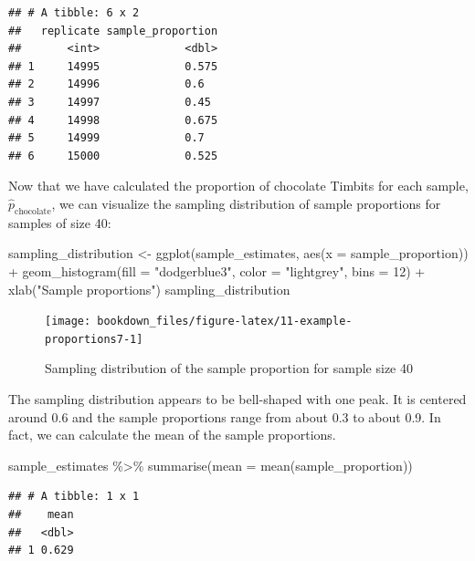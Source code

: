 \documentclass[
]{krantz}
\makeatletter
\newenvironment{Shaded}{\begin{snugshade}}{\end{snugshade}}
\newcommand{\AttributeTok}[1]{\textcolor[rgb]{0.61,0.61,0.61}{#1}}
\newcommand{\DecValTok}[1]{\textcolor[rgb]{0.06,0.06,0.06}{#1}}
\newcommand{\FunctionTok}[1]{\textcolor[rgb]{0,0,0}{#1}}
\newcommand{\NormalTok}[1]{#1}
\newcommand{\OtherTok}[1]{\textcolor[rgb]{0.37,0.37,0.37}{#1}}
\newcommand{\SpecialCharTok}[1]{\textcolor[rgb]{0,0,0}{#1}}
\newcommand{\StringTok}[1]{\textcolor[rgb]{0.5,0.5,0.5}{#1}}
\newenvironment{kframe}{%
\medskip{}
\setlength{\fboxsep}{.8em}
 \def\at@end@of@kframe{}%
 \ifinner\ifhmode%
  \def\at@end@of@kframe{\end{minipage}}%
  \begin{minipage}{\columnwidth}%
 \fi\fi%
 \def\FrameCommand##1{\hskip\@totalleftmargin \hskip-\fboxsep
 \colorbox{shadecolor}{##1}\hskip-\fboxsep
     \hskip-\linewidth \hskip-\@totalleftmargin \hskip\columnwidth}%
 \MakeFramed {\advance\hsize-\width
   \@totalleftmargin\z@ \linewidth\hsize
   \@setminipage}}%
 {\par\unskip\endMakeFramed%
 \at@end@of@kframe}
\renewenvironment{Shaded}{\begin{kframe}}{\end{kframe}}
\makeatother
\begin{document}
\begin{verbatim}
## # A tibble: 6 x 2
##   replicate sample_proportion
##       <int>             <dbl>
## 1     14995             0.575
## 2     14996             0.6  
## 3     14997             0.45 
## 4     14998             0.675
## 5     14999             0.7  
## 6     15000             0.525
\end{verbatim}

Now that we have calculated the proportion of chocolate Timbits for each sample, \(\hat{p}_\text{chocolate}\), we can visualize the sampling distribution of sample proportions for samples of size 40:

\begin{Shaded}
\begin{Highlighting}[]
\NormalTok{sampling\_distribution }\OtherTok{\textless{}{-}} \FunctionTok{ggplot}\NormalTok{(sample\_estimates, }\FunctionTok{aes}\NormalTok{(}\AttributeTok{x =}\NormalTok{ sample\_proportion)) }\SpecialCharTok{+}
  \FunctionTok{geom\_histogram}\NormalTok{(}\AttributeTok{fill =} \StringTok{"dodgerblue3"}\NormalTok{, }\AttributeTok{color =} \StringTok{"lightgrey"}\NormalTok{, }\AttributeTok{bins =} \DecValTok{12}\NormalTok{) }\SpecialCharTok{+}
  \FunctionTok{xlab}\NormalTok{(}\StringTok{"Sample proportions"}\NormalTok{)}
\NormalTok{sampling\_distribution}
\end{Highlighting}
\end{Shaded}

\begin{figure}
\texttt{[image: bookdown\_files/figure-latex/11-example-proportions7-1]} \caption{Sampling distribution of the sample proportion for sample size 40}\label{fig:11-example-proportions7}
\end{figure}

The sampling distribution appears to be bell-shaped with one peak. It is
centered around 0.6 and the
sample proportions range from about 0.3 to
about 0.9. In fact, we can calculate
the mean of the sample proportions.

\begin{Shaded}
\begin{Highlighting}[]
\NormalTok{sample\_estimates }\SpecialCharTok{\%\textgreater{}\%}
  \FunctionTok{summarise}\NormalTok{(}\AttributeTok{mean =} \FunctionTok{mean}\NormalTok{(sample\_proportion))}
\end{Highlighting}
\end{Shaded}

\begin{verbatim}
## # A tibble: 1 x 1
##    mean
##   <dbl>
## 1 0.629
\end{verbatim}
\end{document}
